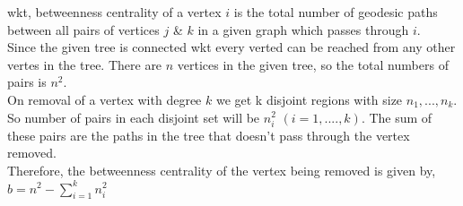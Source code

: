 \documentclass{article}
\begin{document}
wkt, betweenness centrality of a vertex $i$ is the total number of geodesic paths between all pairs of vertices $j$ \& $k$ in a given graph which passes through $i$. \\

Since the given tree is connected wkt every verted can be reached from any other vertes in the tree. There are $n$ vertices in the given tree, so the total numbers of pairs is $n^2$. \\

On removal of a vertex with degree $k$ we get k disjoint regions with size $n_1, . . . ,n_k$. So number of pairs in each disjoint set will be $n^2_i$ $(i=1,....,k)$. The sum of these pairs are the paths in the tree that doesn't pass through the vertex removed.\\

Therefore, the betweenness centrality of the vertex being removed is given by, $ b = n^2 - \sum_{i=1}^{k} n^2_i$
\end{document}
